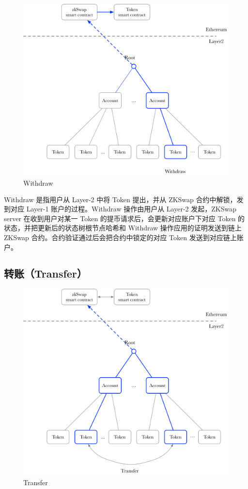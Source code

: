 \documentclass[]{template/llncs}
\begin{document}
\begin{figure}[htbp]
\centering
\includegraphics[width=0.9\columnwidth]{figure/withdraw}
\caption{Withdraw}
\label{fig:withdraw}
\end{figure}

Withdraw 是指用户从 Layer-2 中将 Token 提出，并从 ZKSwap 合约中解锁，发到对应 Layer-1 账户的过程。Withdraw 操作由用户从 Layer-2 发起，ZKSwap server 在收到用户对某一 Token 的提币请求后，会更新对应账户下对应 Token 的状态，并把更新后的状态树根节点哈希和 Withdraw 操作应用的证明发送到链上 ZKSwap 合约。合约验证通过后会把合约中锁定的对应 Token 发送到对应链上账户。

\subsection{转账（Transfer）}

\begin{figure}[htbp]
\centering
\includegraphics[width=0.9\columnwidth]{figure/transfer}
\caption{Transfer}
\label{fig:transfer}
\end{figure}
\end{document}
